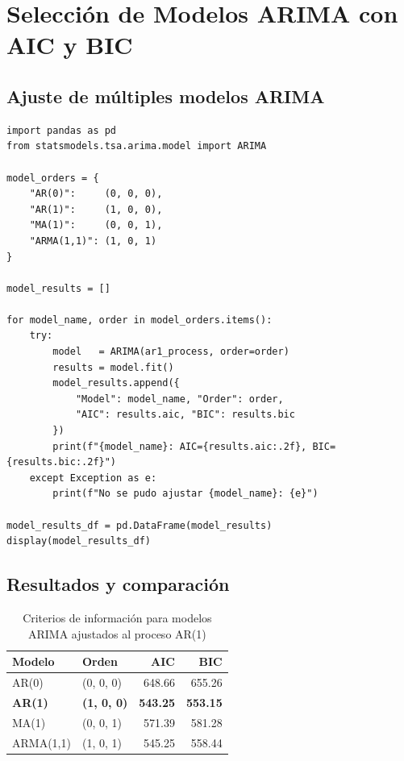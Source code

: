 \documentclass[12pt, a4paper]{article}
\begin{document}
\section{Selección de Modelos ARIMA con AIC y BIC}

\subsection{Ajuste de múltiples modelos ARIMA}

\begin{lstlisting}
import pandas as pd
from statsmodels.tsa.arima.model import ARIMA

model_orders = {
    "AR(0)":     (0, 0, 0),
    "AR(1)":     (1, 0, 0),
    "MA(1)":     (0, 0, 1),
    "ARMA(1,1)": (1, 0, 1)
}

model_results = []

for model_name, order in model_orders.items():
    try:
        model   = ARIMA(ar1_process, order=order)
        results = model.fit()
        model_results.append({
            "Model": model_name, "Order": order,
            "AIC": results.aic, "BIC": results.bic
        })
        print(f"{model_name}: AIC={results.aic:.2f}, BIC={results.bic:.2f}")
    except Exception as e:
        print(f"No se pudo ajustar {model_name}: {e}")

model_results_df = pd.DataFrame(model_results)
display(model_results_df)
\end{lstlisting}

\subsection{Resultados y comparación}

\begin{table}[H]
  \centering
  \caption{Criterios de información para modelos ARIMA ajustados al proceso AR(1)}
  \label{tab:aic_bic}
  \begin{tabular}{llrr}
    \toprule
    \textbf{Modelo} & \textbf{Orden} & \textbf{AIC} & \textbf{BIC} \\
    \midrule
    AR(0)     & (0, 0, 0) & 648.66 & 655.26 \\
    \textbf{AR(1)} & \textbf{(1, 0, 0)} & \textbf{543.25} & \textbf{553.15} \\
    MA(1)     & (0, 0, 1) & 571.39 & 581.28 \\
    ARMA(1,1) & (1, 0, 1) & 545.25 & 558.44 \\
    \bottomrule
  \end{tabular}
\end{table}
\end{document}
